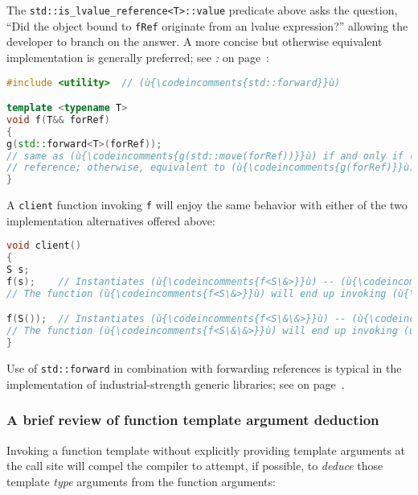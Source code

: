 \noindent The \texttt{std::is\_lvalue\_reference<T>::value} predicate above asks
the question, ``Did the object bound to \texttt{fRef} originate
from an lvalue expression?'' allowing the developer to branch on the
answer. A more concise but otherwise equivalent implementation is
generally preferred; see \textit{: } on page~\pageref{the-std::forward-utility}:

\begin{lstlisting}[language=C++]
#include <utility>  // (ù{\codeincomments{std::forward}}ù)

template <typename T>
void f(T&& forRef)
{
g(std::forward<T>(forRef));
// same as (ù{\codeincomments{g(std::move(forRef))}}ù) if and only if (ù{\codeincomments{forRef}}ù) is an *rvalue*
// reference; otherwise, equivalent to (ù{\codeincomments{g(forRef)}}ù)
}
\end{lstlisting}

\noindent A \texttt{client} function invoking \texttt{f} will enjoy the same
behavior with either of the two implementation alternatives offered
above:

\begin{lstlisting}[language=C++]
void client()
{
S s;
f(s);    // Instantiates (ù{\codeincomments{f<S\&>}}ù) -- (ù{\codeincomments{fRef}}ù) is an lvalue reference ((ù{\codeincomments{S\&}}ù)).
// The function (ù{\codeincomments{f<S\&>}}ù) will end up invoking (ù{\codeincomments{g(S\&)}}ù).

f(S());  // Instantiates (ù{\codeincomments{f<S\&\&>}}ù) -- (ù{\codeincomments{fRef}}ù) is an rvalue reference ((ù{\codeincomments{S\&\&}}ù)).
// The function (ù{\codeincomments{f<S\&\&>}}ù) will end up invoking (ù{\codeincomments{g(S\&\&)}}ù).
}
\end{lstlisting}

\noindent Use of \texttt{std::forward} in combination with forwarding references
is typical in the implementation of industrial-strength generic
libraries; see \textit{} on page~\pageref{use-cases-forwardingref}.

\subsubsection[A brief review of function template argument deduction]{A brief review of function template argument deduction}\label{a-brief-review-of-function-template-argument-deduction}

Invoking a function template without explicitly providing template
arguments at the call site will compel the compiler to attempt, if
possible, to \emph{deduce} those template \emph{type} arguments from the
function arguments:

